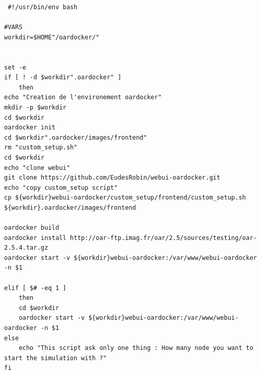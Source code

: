 \documentclass[a4paper,10pt]{article}
\begin{document}
\begin{lstlisting}
 #!/usr/bin/env bash

#VARS
workdir=$HOME"/oardocker/"


set -e
if [ ! -d $workdir".oardocker" ]
	then
echo "Creation de l'environement oardocker"
mkdir -p $workdir
cd $workdir
oardocker init
cd $workdir".oardocker/images/frontend"
rm "custom_setup.sh"
cd $workdir
echo "clone webui"
git clone https://github.com/EudesRobin/webui-oardocker.git
echo "copy custom_setup script"
cp ${workdir}webui-oardocker/custom_setup/frontend/custom_setup.sh ${workdir}.oardocker/images/frontend

oardocker build
oardocker install http://oar-ftp.imag.fr/oar/2.5/sources/testing/oar-2.5.4.tar.gz
oardocker start -v ${workdir}webui-oardocker:/var/www/webui-oardocker -n $1

elif [ $# -eq 1 ]
	then
	cd $workdir
	oardocker start -v ${workdir}webui-oardocker:/var/www/webui-oardocker -n $1
else
	echo "This script ask only one thing : How many node you want to start the simulation with ?"
fi
\end{lstlisting}
\end{document}
